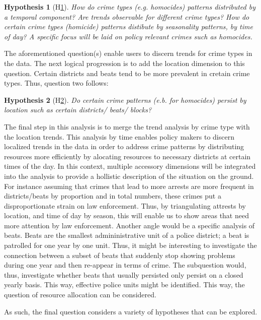 \documentclass[a4paper]{article}
\newtheorem{hyp}{Hypothesis}
\begin{document}
\begin{hyp}[H\ref{hyp:first}] \label{hyp:first}
How do crime types (e.g. homocides) patterns distributed by a temporal component? Are trends observable for different crime types?
How do certain crime types (homicide) patterns distibute by seasonality patterns, by time of day? A specific focus will be laid on policy relevant crimes such as homocides.
\end{hyp}

The aforementioned question(s) enable users to discern trends for crime types in the data. The next logical progression is to add the location dimension to this question. Certain districts and beats tend to be more prevalent in cretain crime types. Thus, question two follows:

\begin{hyp}[H\ref{hyp:second}] \label{hyp:second}
Do certain crime patterns (e.b. for homocides) persist by location such as certain districts/ beats/ blocks?
\end{hyp}

The final step in this analysis is to merge the trend analysis by crime type with the location trends. This analysis by time enables policy makers to discern localized trends in the data in order to address crime patterns by distributing resources more efficiently by alocating resources to necessary districts at certain times of the day. In this context, multiple accessory dimensions will be integrated into the analysis to provide a hollistic description of the situation on the ground. For instance assuming that crimes that lead to more arrests are more frequent in districts/beats by proportion and in total numbers, these crimes put a disproportionate strain on law enforcement. Thus, by triangulating attrests by location, and time of day by season, this will enable us to show areas that need more attention by law enforcement. Another angle would be a specific analysis of beats. Beats are the smallest admininistrative unit of a police district; a beat is patrolled for one year by one unit. Thus, it might be interesting to investigate the connection between a subset of beats that suddenly stop showing problems during one year and then re-appear in terms of crime. The subquestion would, thus, investigate whether beats that usually persisted only persist on a closed yearly basis. This way, effective police units might be identified. This way, the question of resource allocation can be considered. 

As such, the final question considers a variety of hypotheses that can be explored. 
\end{document}
